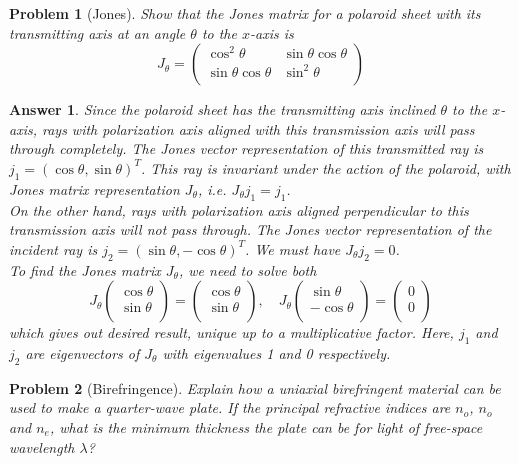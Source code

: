 \documentclass[a4paper]{article}
\newtheorem{ans}{Answer}[section]
\theoremstyle{new}
\newtheorem{qns}{Problem}[section]
\begin{document}
\newpage
\begin{qns}[Jones]
Show that the Jones matrix for a polaroid sheet with its transmitting axis at an angle $\theta$ to the $x$-axis is
$$J_\theta=\begin{pmatrix}\cos^2\theta&\sin\theta\cos\theta\\\sin\theta\cos\theta&\sin^2\theta\\\end{pmatrix}$$
\end{qns}
\begin{ans}
Since the polaroid sheet has the transmitting axis inclined $\theta$ to the $x$-axis, rays with polarization axis aligned with this transmission axis will pass through completely. The Jones vector representation of this transmitted ray is $j_1=(\cos\theta,\sin\theta)^T$. This ray is invariant under the action of the polaroid, with Jones matrix representation $J_\theta$, i.e. $J_\theta j_1=j_1$.\\[5pt]
On the other hand, rays with polarization axis aligned perpendicular to this transmission axis will not pass through. The Jones vector representation of the incident ray is $j_2=(\sin\theta,-\cos\theta)^T$. We must have $J_\theta j_2=0$.\\[5pt]
To find the Jones matrix $J_\theta$, we need to solve both
$$J_\theta\begin{pmatrix}\cos\theta\\\sin\theta\\\end{pmatrix}=\begin{pmatrix}\cos\theta\\\sin\theta\\\end{pmatrix},\quad J_\theta\begin{pmatrix}\sin\theta\\-\cos\theta\\\end{pmatrix}=\begin{pmatrix}0\\0\\\end{pmatrix}$$
which gives out desired result, unique up to a multiplicative factor. Here, $j_1$ and $j_2$ are eigenvectors of $J_\theta$ with eigenvalues 1 and 0 respectively.
\end{ans}
\begin{qns}[Birefringence]
Explain how a uniaxial birefringent material can be used to make a quarter-wave plate. If the principal refractive indices are $n_o$, $n_o$ and $n_e$, what is the minimum thickness the plate can be for light of free-space wavelength $\lambda$?
\end{qns}
\end{document}
